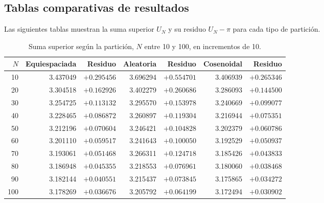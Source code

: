 \subsection{Tablas comparativas de resultados}

Las siguientes tablas muestran la suma superior \(U_N\) y su residuo \(U_N-\pi\) para cada tipo de partición.

\begin{table}[H]
\centering
\caption{Suma superior según la partición, \(N\) entre 10 y 100, en incrementos de 10.}
\label{tab:e2_10a100}
\small
\setlength{\tabcolsep}{4pt}
\begin{tabular}{r r r r r r r}
\toprule
\(N\) & Equiespaciada & Residuo & Aleatoria & Residuo & Cosenoidal & Residuo \\
\midrule
10    & 3.437049 & \(+0.295456\) & 3.696294 & \(+0.554701\) & 3.406939 & \(+0.265346\) \\
20    & 3.304518 & \(+0.162926\) & 3.402279 & \(+0.260686\) & 3.286093 & \(+0.144500\) \\
30    & 3.254725 & \(+0.113132\) & 3.295570 & \(+0.153978\) & 3.240669 & \(+0.099077\) \\
40    & 3.228465 & \(+0.086872\) & 3.260897 & \(+0.119304\) & 3.216944 & \(+0.075351\) \\
50    & 3.212196 & \(+0.070604\) & 3.246421 & \(+0.104828\) & 3.202379 & \(+0.060786\) \\
60    & 3.201110 & \(+0.059517\) & 3.241643 & \(+0.100050\) & 3.192529 & \(+0.050937\) \\
70    & 3.193061 & \(+0.051468\) & 3.266311 & \(+0.124718\) & 3.185426 & \(+0.043833\) \\
80    & 3.186948 & \(+0.045355\) & 3.218553 & \(+0.076961\) & 3.180060 & \(+0.038468\) \\
90    & 3.182144 & \(+0.040551\) & 3.215437 & \(+0.073845\) & 3.175865 & \(+0.034272\) \\
100   & 3.178269 & \(+0.036676\) & 3.205792 & \(+0.064199\) & 3.172494 & \(+0.030902\) \\
\bottomrule
\end{tabular}
\end{table}

